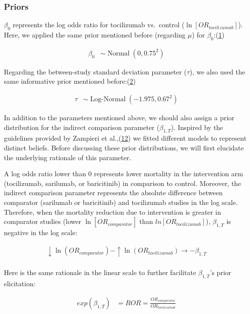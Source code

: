\documentclass[
  12pt,
]{article}
\begin{document}
\hypertarget{priors}{%
\subsubsection{Priors}\label{priors}}

\(\beta_0\) represents the log odds ratio for tocilizumab vs.~control
(\(\ln[OR_{tocilizumab}]\)). Here, we applied the same prior mentioned
before (regarding \(\mu\)) for
\(\beta_0\):(\protect\hyperlink{ref-pedroza2018}{1})

\begin{align*}
\beta_0 & \sim \operatorname{Normal}(0, 0.75^2)
\end{align*}

Regarding the between-study standard deviation parameter (\(\tau\)), we
also used the same informative prior mentioned
before:(\protect\hyperlink{ref-turner2015}{2})

\begin{align*}
\tau & \sim \operatorname{Log-Normal}(-1.975, 0.67^2)
\end{align*}

In addition to the parameters mentioned above, we should also assign a
prior distribution for the indirect comparison parameter
(\(\beta_{1, T}\)). Inspired by the guidelines provided by Zampieri et
al.,(\protect\hyperlink{ref-zampieri2021}{12}) we fitted different
models to represent distinct beliefs. Before discussing these prior
distributions, we will first elucidate the underlying rationale of this
parameter.

A log odds ratio lower than \(0\) represents lower mortality in the
intervention arm (tocilizumab, sarilumab, or baricitinib) in comparison
to control. Moreover, the indirect comparison parameter represents the
absolute difference between comparator (sarilumab or baricitinib) and
tocilizumab studies in the log scale. Therefore, when the mortality
reduction due to intervention is greater in comparator studies (lower
\(\ln[OR_{comparator}]\) than \(ln[OR_{tocilizumab}]\)),
\(\beta_{1, T}\) is negative in the log scale:

\begin{align*}
\downarrow \ln(OR_{comparator}) - \uparrow \ln(OR_{tocilizumab}) \rightarrow -\beta_{1, T}\\
\end{align*}

Here is the same rationale in the linear scale to further facilitate
\(\beta_{1, T}\)'s prior elicitation:

\begin{align*}
exp(\beta_{1, T}) &= ROR =  \frac {OR_{comparator}}{OR_{tocilizumab}}
\end{align*}
\end{document}
